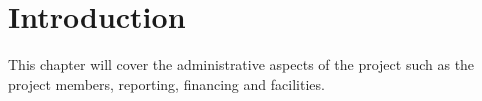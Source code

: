\section{Introduction}
This chapter will cover the administrative aspects of the project such as the project members, reporting, financing and facilities.

